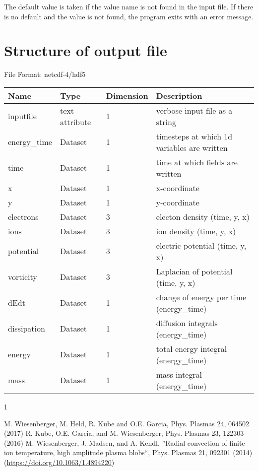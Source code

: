 \documentclass{hitec}
\renewenvironment{thebibliography}[1]{
  \begin{oldthebibliography}{#1}
    \RaggedRight %
    \setlength{\itemsep}{0em}
    \setlength{\parskip}{0em}
}
{
  \end{oldthebibliography}
}
\begin{document}
The default value is taken if the value name is not found in the input file. If there is no default and
the value is not found,
the program exits with an error message.


\section{Structure of output file}
File Format: netcdf-4/hdf5
%
\begin{longtable}{lll>{\RaggedRight}p{7cm}}
\toprule
\rowcolor{gray!50}\textbf{Name} &  \textbf{Type} & \textbf{Dimension} & \textbf{Description}  \\ \midrule
inputfile  &             text attribute & 1 & verbose input file as a string \\
energy\_time             & Dataset & 1 & timesteps at which 1d variables are written \\
time                     & Dataset & 1 & time at which fields are written \\
x                        & Dataset & 1 & x-coordinate  \\
y                        & Dataset & 1 & y-coordinate \\
electrons                & Dataset & 3 & electon density (time, y, x) \\
ions                     & Dataset & 3 & ion density (time, y, x) \\
potential                & Dataset & 3 & electric potential (time, y, x) \\
vorticity                & Dataset & 3 & Laplacian of potential (time, y, x) \\
dEdt                     & Dataset & 1 & change of energy per time (energy\_time) \\
dissipation              & Dataset & 1 & diffusion integrals (energy\_time) \\
energy                   & Dataset & 1 & total energy integral (energy\_time) \\
mass                     & Dataset & 1 & mass integral (energy\_time)  \\
\bottomrule
\end{longtable}
\begin{thebibliography}{1}
    M. Wiesenberger, M. Held, R. Kube and O.E. Garcia, Phys. Plasmas {24}, 064502 (2017)
    R. Kube, O.E. Garcia, and M. Wiesenberger, Phys. Plasmas {23}, 122303 (2016)
    M. Wiesenberger, J. Madsen, and A. Kendl, ''Radial convection of finite ion tem\-per\-a\-ture, high amplitude plasma blobs``, Phys. Plasmas { 21}, 092301 (2014) (\mbox{\url{https://doi.org/10.1063/1.4894220}})
\end{thebibliography}
\end{document}
